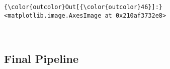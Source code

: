 \documentclass[11pt]{article}
\begin{document}
\begin{Verbatim}[commandchars=\\\{\}]
{\color{outcolor}Out[{\color{outcolor}46}]:} <matplotlib.image.AxesImage at 0x210af3732e8>
\end{Verbatim}
            
    \begin{center}
    \end{center}
    { \hspace*{\fill} \\}
    
    \hypertarget{final-pipeline}{%
\subsection{Final Pipeline}\label{final-pipeline}}
\end{document}
